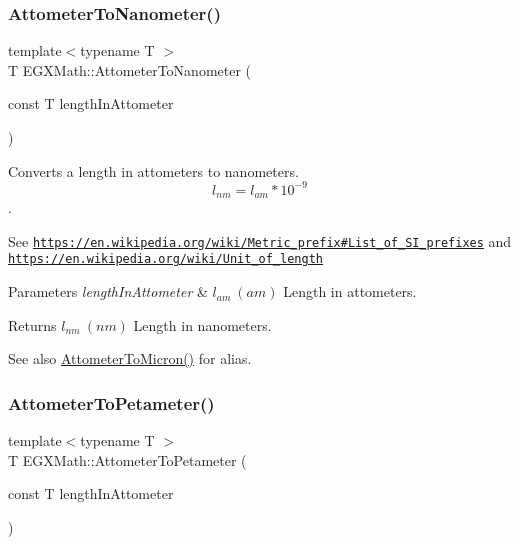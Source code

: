 \subsubsection{\texorpdfstring{Attometer\+To\+Nanometer()}{AttometerToNanometer()}}
{\footnotesize\ttfamily template$<$typename T $>$ \\
T E\+G\+X\+Math\+::\+Attometer\+To\+Nanometer (\begin{DoxyParamCaption}\item[{const T}]{length\+In\+Attometer }\end{DoxyParamCaption})}



Converts a length in attometers to nanometers. \[ l_{nm}=l_{am} * 10^{-9} \]. 

See \href{https://en.wikipedia.org/wiki/Metric_prefix#List_of_SI_prefixes}{\tt https\+://en.\+wikipedia.\+org/wiki/\+Metric\+\_\+prefix\#\+List\+\_\+of\+\_\+\+S\+I\+\_\+prefixes} and \href{https://en.wikipedia.org/wiki/Unit_of_length}{\tt https\+://en.\+wikipedia.\+org/wiki/\+Unit\+\_\+of\+\_\+length} 
\begin{DoxyParams}{Parameters}
{\em length\+In\+Attometer} & $ l_{am}\ (am)$ Length in attometers. \\
\hline
\end{DoxyParams}
\begin{DoxyReturn}{Returns}
$ l_{nm}\ (nm)$ Length in nanometers. 
\end{DoxyReturn}
\begin{DoxySeeAlso}{See also}
\mbox{\hyperlink{group___e_g_x_math-_conversions-_length_conversions-_s_i-_attometer-_non-_s_i_ga9aaf945221fbc8d469121e0fd0980b41}{Attometer\+To\+Micron()}} for alias. 
\end{DoxySeeAlso}
\mbox{\label{group___e_g_x_math-_conversions-_length_conversions-_s_i-_attometer-_s_i_ga780e4aa3b174598a72aefa3bdd960447}} 
\subsubsection{\texorpdfstring{Attometer\+To\+Petameter()}{AttometerToPetameter()}}
{\footnotesize\ttfamily template$<$typename T $>$ \\
T E\+G\+X\+Math\+::\+Attometer\+To\+Petameter (\begin{DoxyParamCaption}\item[{const T}]{length\+In\+Attometer }\end{DoxyParamCaption})}



